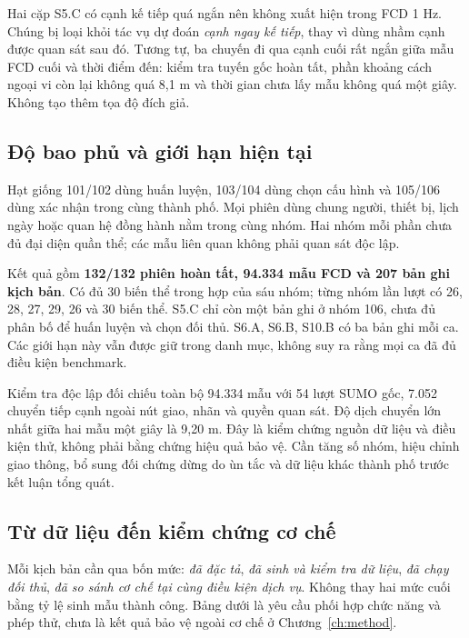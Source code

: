 Hai cặp S5.C có cạnh kế tiếp quá ngắn nên không xuất hiện trong FCD 1 Hz. Chúng bị loại khỏi tác vụ dự đoán \emph{cạnh ngay kế tiếp}, thay vì dùng nhầm cạnh được quan sát sau đó. Tương tự, ba chuyến đi qua cạnh cuối rất ngắn giữa mẫu FCD cuối và thời điểm đến: kiểm tra tuyến gốc hoàn tất, phần khoảng cách ngoại vi còn lại không quá 8,1 m và thời gian chưa lấy mẫu không quá một giây. Không tạo thêm tọa độ đích giả.

\subsection{Độ bao phủ và giới hạn hiện tại}

Hạt giống 101/102 dùng huấn luyện, 103/104 dùng chọn cấu hình và 105/106 dùng xác nhận trong cùng thành phố. Mọi phiên dùng chung người, thiết bị, lịch ngày hoặc quan hệ đồng hành nằm trong cùng nhóm. Hai nhóm mỗi phần chưa đủ đại diện quần thể; các mẫu liên quan không phải quan sát độc lập.

Kết quả gồm \textbf{132/132 phiên hoàn tất, 94.334 mẫu FCD và 207 bản ghi kịch bản}. Có đủ 30 biến thể trong hợp của sáu nhóm; từng nhóm lần lượt có 26, 28, 27, 29, 26 và 30 biến thể. S5.C chỉ còn một bản ghi ở nhóm 106, chưa đủ phân bố để huấn luyện và chọn đối thủ. S6.A, S6.B, S10.B có ba bản ghi mỗi ca. Các giới hạn này vẫn được giữ trong danh mục, không suy ra rằng mọi ca đã đủ điều kiện benchmark.

Kiểm tra độc lập đối chiếu toàn bộ 94.334 mẫu với 54 lượt SUMO gốc, 7.052 chuyển tiếp cạnh ngoài nút giao, nhãn và quyền quan sát. Độ dịch chuyển lớn nhất giữa hai mẫu một giây là 9,20 m. Đây là kiểm chứng nguồn dữ liệu và điều kiện thử, không phải bằng chứng hiệu quả bảo vệ. Cần tăng số nhóm, hiệu chỉnh giao thông, bổ sung đối chứng dừng do ùn tắc và dữ liệu khác thành phố trước kết luận tổng quát.

\clearpage
\subsection{Từ dữ liệu đến kiểm chứng cơ chế}

Mỗi kịch bản cần qua bốn mức: \emph{đã đặc tả}, \emph{đã sinh và kiểm tra dữ liệu}, \emph{đã chạy đối thủ}, \emph{đã so sánh cơ chế tại cùng điều kiện dịch vụ}. Không thay hai mức cuối bằng tỷ lệ sinh mẫu thành công. Bảng dưới là yêu cầu phối hợp chức năng và phép thử, chưa là kết quả bảo vệ ngoài cơ chế ở Chương~\ref{ch:method}.

